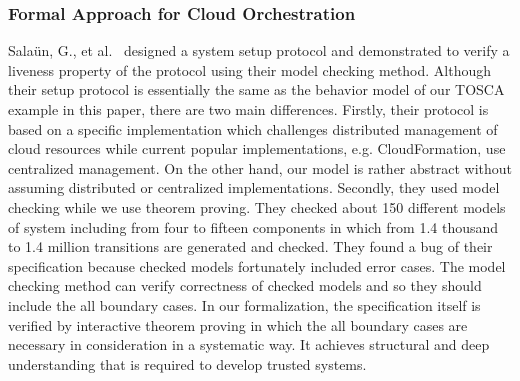\documentclass[12pt]{report}
\begin{document}
\subsubsection{Formal Approach for Cloud Orchestration}
Sala{\"u}n, G., et
al.~\cite{EtcheversCBP11,SalaunBCPEG13,SalaunEPBC13} designed a system
setup protocol and demonstrated to verify a liveness property of the
protocol using their model checking method. Although their setup
protocol is essentially the same as the behavior model of our TOSCA
example in this paper, there are two main differences. Firstly, their
protocol is based on a specific implementation which challenges
distributed management of cloud resources while current popular
implementations, e.g. CloudFormation, use centralized management. On
the other hand, our model is rather abstract without assuming
distributed or centralized implementations. Secondly, they used model
checking while we use theorem proving. They checked about 150
different models of system including from four to fifteen components
in which from 1.4 thousand to 1.4 million transitions are generated
and checked. They found a bug of their specification because checked
models fortunately included error cases. The model checking method can
verify correctness of checked models and so they should include the all
boundary cases. In our formalization, the specification itself is
verified by interactive theorem proving in which the all boundary cases
are necessary in consideration in a systematic way. It achieves
structural and deep understanding that is required to develop trusted
systems.

\end{document}
